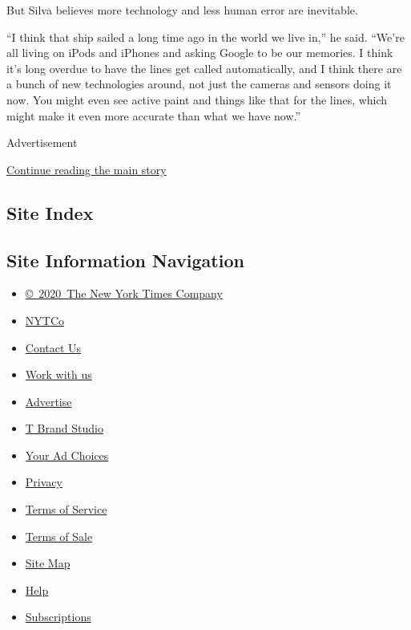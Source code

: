 But Silva believes more technology and less human error are inevitable.

``I think that ship sailed a long time ago in the world we live in,'' he
said. ``We're all living on iPods and iPhones and asking Google to be
our memories. I think it's long overdue to have the lines get called
automatically, and I think there are a bunch of new technologies around,
not just the cameras and sensors doing it now. You might even see active
paint and things like that for the lines, which might make it even more
accurate than what we have now.''

Advertisement

\protect\hyperlink{after-bottom}{Continue reading the main story}

\hypertarget{site-index}{%
\subsection{Site Index}\label{site-index}}

\hypertarget{site-information-navigation}{%
\subsection{Site Information
Navigation}\label{site-information-navigation}}

\begin{itemize}
\tightlist
\item
  \href{https://help.nytimes.com/hc/en-us/articles/115014792127-Copyright-notice}{©~2020~The
  New York Times Company}
\end{itemize}

\begin{itemize}
\tightlist
\item
  \href{https://www.nytco.com/}{NYTCo}
\item
  \href{https://help.nytimes.com/hc/en-us/articles/115015385887-Contact-Us}{Contact
  Us}
\item
  \href{https://www.nytco.com/careers/}{Work with us}
\item
  \href{https://nytmediakit.com/}{Advertise}
\item
  \href{http://www.tbrandstudio.com/}{T Brand Studio}
\item
  \href{https://www.nytimes.com/privacy/cookie-policy\#how-do-i-manage-trackers}{Your
  Ad Choices}
\item
  \href{https://www.nytimes.com/privacy}{Privacy}
\item
  \href{https://help.nytimes.com/hc/en-us/articles/115014893428-Terms-of-service}{Terms
  of Service}
\item
  \href{https://help.nytimes.com/hc/en-us/articles/115014893968-Terms-of-sale}{Terms
  of Sale}
\item
  \href{https://spiderbites.nytimes.com}{Site Map}
\item
  \href{https://help.nytimes.com/hc/en-us}{Help}
\item
  \href{https://www.nytimes.com/subscription?campaignId=37WXW}{Subscriptions}
\end{itemize}
